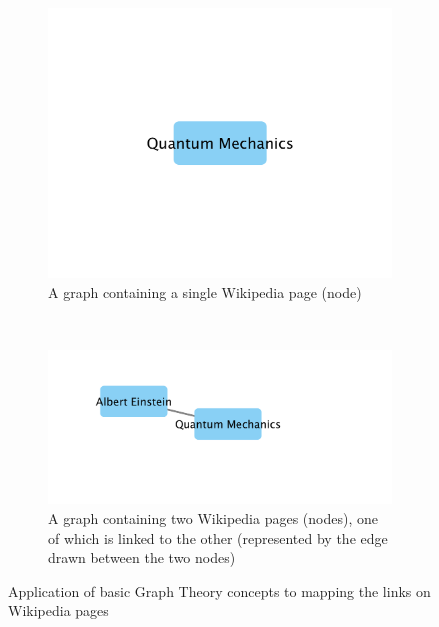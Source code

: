 \documentclass[man, 12pt, floatsintext, donotrepeattitle]{apa6}
\begin{document}
\begin{figure}
    \centering
    \begin{subfigure}[b]{0.45\textwidth}
        \includegraphics[width=\textwidth]{Resources/QuantumMechanics_v_1_e_0.png}
        \caption{\fontsize{10pt}{12pt}\selectfont A graph containing a single Wikipedia page (node)}
\label{fig:Node}
    \end{subfigure}
    ~ %
    \begin{subfigure}[b]{0.45\textwidth}
        \includegraphics[width=\textwidth]{Resources/QuantumMechanics_v_2_e_1.png}
        \caption{\fontsize{10pt}{12pt}\selectfont A graph containing two Wikipedia pages (nodes), one of
        which is linked to the other (represented by the edge
        drawn between the two nodes)}
\label{fig:NodesAndLink}
    \end{subfigure}
    \caption[Basic Graph Theory Example]{\fontsize{10pt}{12pt}\selectfont Application of basic Graph Theory concepts to
    mapping the links on Wikipedia pages}\label{fig:GraphTheoryExample}
\end{figure}
\end{document}
